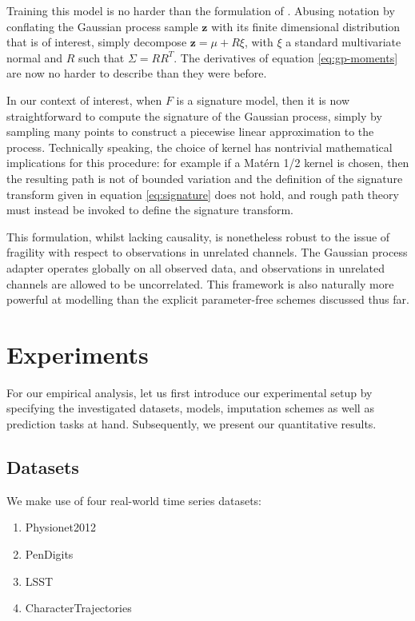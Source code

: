 \documentclass{article}
\begin{document}
Training this model is no harder than the formulation of \cite{li2016scalable}. Abusing notation by conflating the Gaussian process sample $\mathbf{z}$ with its finite dimensional distribution that is of interest, simply decompose $\mathbf{z} = \mu + R \xi$, with $\xi$ a standard multivariate normal and $R$ such that $\Sigma = RR^T$. The derivatives of equation \eqref{eq:gp-moments} are now no harder to describe than they were before.

In our context of interest, when $F$ is a signature model, then it is now straightforward to compute the signature of the Gaussian process, simply by sampling many points to construct a piecewise linear approximation to the process. Technically speaking, the choice of kernel has nontrivial mathematical implications for this procedure: for example if a Mat{\'e}rn 1/2 kernel is chosen, then the resulting path is not of bounded variation and the definition of the signature transform given in equation \eqref{eq:signature} does not hold, and rough path theory \cite{lyons1998differential} must instead be invoked to define the signature transform.

This formulation, whilst lacking causality, is nonetheless robust to the issue of fragility with respect to observations in unrelated channels. The Gaussian process adapter operates globally on all observed data, and observations in unrelated channels are allowed to be uncorrelated. This framework is also naturally more powerful at modelling than the explicit parameter-free schemes discussed thus far.

\section{Experiments}
For our empirical analysis, let us first introduce our experimental setup by specifying the investigated datasets, models, imputation schemes as well as prediction tasks at hand. Subsequently, we present our quantitative results.
\subsection{Datasets}
We make use of four real-world time series datasets:
\begin{enumerate}
    \item Physionet2012
    \item PenDigits
    \item LSST
    \item CharacterTrajectories
\end{enumerate}
\end{document}
